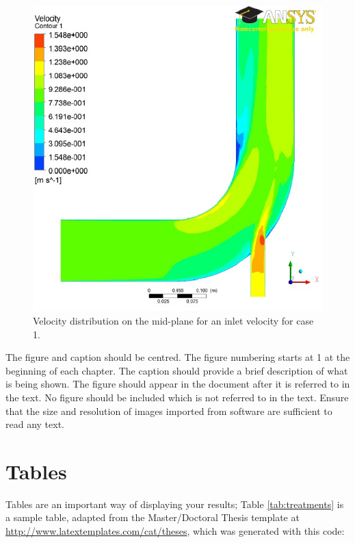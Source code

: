 \begin{figure}[h]
      \centering
      \includegraphics{background/5e1-1.pdf}
      \caption{Velocity distribution on the mid-plane for an inlet velocity for case 1.}
      \label{veldis}
\end{figure}

The figure and caption should be centred. The figure numbering starts at 1 at the beginning of each chapter. The caption should provide a brief description of what is being shown. The figure should appear in the document after it is referred to in the text. No figure should be included which is not referred to in the text. Ensure that the size and resolution of images imported from software are sufficient to read any text.

\section{Tables}
Tables are an important way of displaying your results; Table \ref{tab:treatments} is a sample table, adapted from the Master/Doctoral Thesis template at \url{http://www.latextemplates.com/cat/theses}, which was generated with this code:

